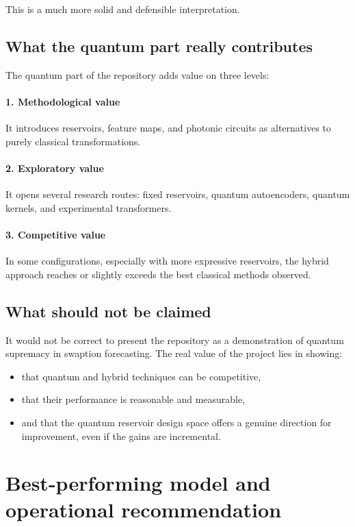 \documentclass[11pt,a4paper]{article}
\begin{document}
This is a much more solid and defensible interpretation.

\subsection{What the quantum part really contributes}

The quantum part of the repository adds value on three levels:

\paragraph{1. Methodological value}
It introduces reservoirs, feature maps, and photonic circuits as alternatives to purely classical transformations.

\paragraph{2. Exploratory value}
It opens several research routes: fixed reservoirs, quantum autoencoders, quantum kernels, and experimental transformers.

\paragraph{3. Competitive value}
In some configurations, especially with more expressive reservoirs, the hybrid approach reaches or slightly exceeds the best classical methods observed.

\subsection{What should not be claimed}
It would not be correct to present the repository as a demonstration of quantum supremacy in swaption forecasting. The real value of the project lies in showing:

\begin{itemize}
    \item that quantum and hybrid techniques can be competitive,
    \item that their performance is reasonable and measurable,
    \item and that the quantum reservoir design space offers a genuine direction for improvement, even if the gains are incremental.
\end{itemize}

\section{Best-performing model and operational recommendation}
\end{document}
